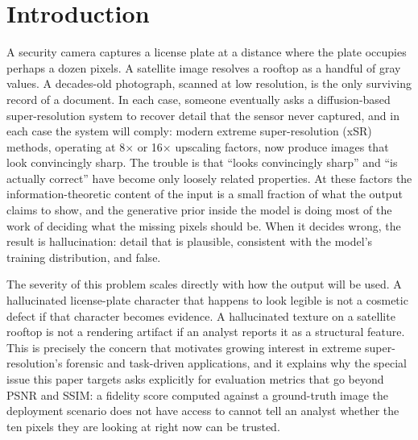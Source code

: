 \documentclass[review]{elsarticle}
\begin{document}
\linenumbers

\section{Introduction}
\label{sec:intro}

A security camera captures a license plate at a distance where the plate occupies perhaps a dozen pixels. A satellite image resolves a rooftop as a handful of gray values. A decades-old photograph, scanned at low resolution, is the only surviving record of a document. In each case, someone eventually asks a diffusion-based super-resolution system to recover detail that the sensor never captured, and in each case the system will comply: modern extreme super-resolution (xSR) methods, operating at 8$\times$ or 16$\times$ upscaling factors, now produce images that look convincingly sharp. The trouble is that ``looks convincingly sharp'' and ``is actually correct'' have become only loosely related properties. At these factors the information-theoretic content of the input is a small fraction of what the output claims to show, and the generative prior inside the model is doing most of the work of deciding what the missing pixels should be. When it decides wrong, the result is hallucination: detail that is plausible, consistent with the model's training distribution, and false.

The severity of this problem scales directly with how the output will be used. A hallucinated license-plate character that happens to look legible is not a cosmetic defect if that character becomes evidence. A hallucinated texture on a satellite rooftop is not a rendering artifact if an analyst reports it as a structural feature. This is precisely the concern that motivates growing interest in extreme super-resolution's forensic and task-driven applications, and it explains why the special issue this paper targets asks explicitly for evaluation metrics that go beyond PSNR and SSIM: a fidelity score computed against a ground-truth image the deployment scenario does not have access to cannot tell an analyst whether the ten pixels they are looking at right now can be trusted.
\end{document}
